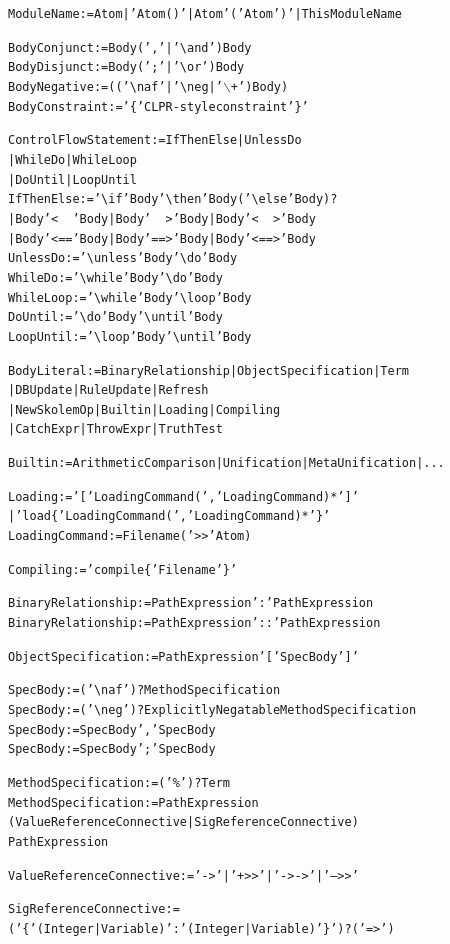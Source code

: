 \documentclass[11pt]{article}
\newcommand{\bs}{\textbackslash}
\newcommand{\RULELOGNAF}{{\texttt{{\bs}naf}}\xspace}
\newcommand{\RULELOGNEG}{{\texttt{{\bs}neg}}\xspace}
\begin{document}
\begin{alltt}
ModuleName := Atom | 'Atom()' | Atom '(' Atom ')' | ThisModuleName

BodyConjunct := Body (',' | '\bs{}and') Body
BodyDisjunct := Body (';' | '\bs{}or') Body
BodyNegative := (('\RULELOGNAF' | '\RULELOGNEG | '\ensuremath{\backslash}+') Body)
BodyConstraint := '\{' CLPR-style constraint '\}'

ControlFlowStatement  := IfThenElse | UnlessDo
                          | WhileDo | WhileLoop
                          | DoUntil | LoopUntil
IfThenElse := '\bs{}if' Body '\bs{}then' Body  ('\bs{}else' Body)?
                | Body '<~~' Body | Body '~~>' Body | Body '<~~>' Body
                | Body '<==' Body | Body '==>' Body | Body '<==>' Body
UnlessDo   := '\bs{}unless' Body '\bs{}do' Body
WhileDo    := '\bs{}while' Body '\bs{}do' Body
WhileLoop  := '\bs{}while' Body '\bs{}loop' Body
DoUntil    := '\bs{}do' Body '\bs{}until' Body
LoopUntil  := '\bs{}loop' Body '\bs{}until' Body

BodyLiteral := BinaryRelationship | ObjectSpecification | Term
                | DBUpdate | RuleUpdate | Refresh
                | NewSkolemOp | Builtin | Loading | Compiling
                | CatchExpr | ThrowExpr | TruthTest

Builtin := ArithmeticComparison | Unification | MetaUnification | ...

Loading := '[' LoadingCommand (',' LoadingCommand)* ']'
           | 'load\{' LoadingCommand (',' LoadingCommand)* '\}'
LoadingCommand := Filename ('>>' Atom)

Compiling := 'compile\{' Filename '\}'

BinaryRelationship := PathExpression ':' PathExpression
BinaryRelationship := PathExpression '::' PathExpression

ObjectSpecification := PathExpression '[' SpecBody ']'

SpecBody := ('\RULELOGNAF')? MethodSpecification
SpecBody := ('\RULELOGNEG')? ExplicitlyNegatableMethodSpecification
SpecBody := SpecBody ',' SpecBody
SpecBody := SpecBody ';' SpecBody

MethodSpecification :=  ('\%')? Term
MethodSpecification :=  PathExpression
                        (ValueReferenceConnective | SigReferenceConnective)
                        PathExpression

ValueReferenceConnective :=  '->' | '+>>' | '->->' | '-->>'

SigReferenceConnective := ('\{' (Integer|Variable) ':' (Integer|Variable) '\}')? ('=>' )


\end{alltt}
\end{document}
